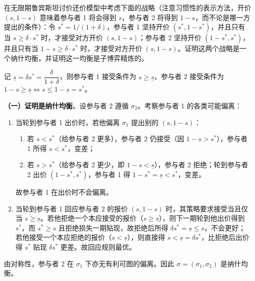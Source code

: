 在无限期鲁宾斯坦讨价还价模型中考虑下面的战略（注意习惯性的表示方法，开价 $(s,1-s)$ 意味着参与者 1 将会得到 $s$，参与者 2 将得到 $1-s$，而不论是哪一方提出的条件）：令 $s^*=1/(1+\delta)$，参与者 1 坚持开价 $(s^*,1-s^*)$，并且只有当 $s\ge \delta\cdot s^*$ 时，才接受对方开价 $(s,1-s)$；参与者 2 坚持开价 $(1-s^*,s^*)$，并且只有当 $1-s\ge \delta\cdot s^*$ 时，才接受对方开价 $(s,1-s)$。证明这两个战略是一个纳什均衡，并证明这一均衡是子博弈精炼的。

\sol
记 $\underline{s}=\delta s^*=\dfrac{\delta}{1+\delta}$，则参与者 1 接受条件为 $s\ge \underline{s}$，参与者 2 接受条件为 $1-s\ge \underline{s}\iff s\le 1-\underline{s}=s^*$。

\textbf{（一）证明是纳什均衡}。设参与者 2 遵循 $\sigma_2$。考察参与者 1 的各类可能偏离：
\begin{enumerate}[leftmargin=*,label=(\alph*)]
  \item 当轮到参与者 1 出价时，若他偏离 $\sigma_1$ 提出别的 $(s,1-s)$：
        \begin{enumerate}[leftmargin=*]
          \item 若 $s<s^*$（给参与者 2 更多），参与者 2 仍接受（因 $1-s>s^*$），参与者 1 所得 $s<s^*$，变差；
          \item 若 $s>s^*$（给参与者 2 更少，即 $1-s<\underline{s}$），参与者 2 拒绝；轮到参与者 2 出价 $(1-s^*,s^*)$，参与者 1 得 $1-s^*=\underline{s}<s^*$，变差。
        \end{enumerate}
        故参与者 1 在出价时不会偏离。
  \item 当轮到参与者 1 回应参与者 2 的报价 $(s,1-s)$ 时，其策略要求接受当且仅当 $s\ge \underline{s}$。若他拒绝一个本应接受的报价（$s\ge\underline{s}$），则下一期轮到他出价得到 $s^*$，而 $s^*\ge s$ 且拒绝损失一期贴现，故拒绝后所得 $\delta s^*=\underline{s}\le s$，不会更好；若他接受一个本应拒绝的报价（$s<\underline{s}$），则直接得 $s<\underline{s}=\delta s^*$，比拒绝后出价得 $s^*$ 贴现 $\delta s^*$ 更差。故回应规则最优。
\end{enumerate}
由对称性，参与者 2 在 $\sigma_1$ 下亦无有利可图的偏离。因此 $\sigma=(\sigma_1,\sigma_2)$ 是纳什均衡。

